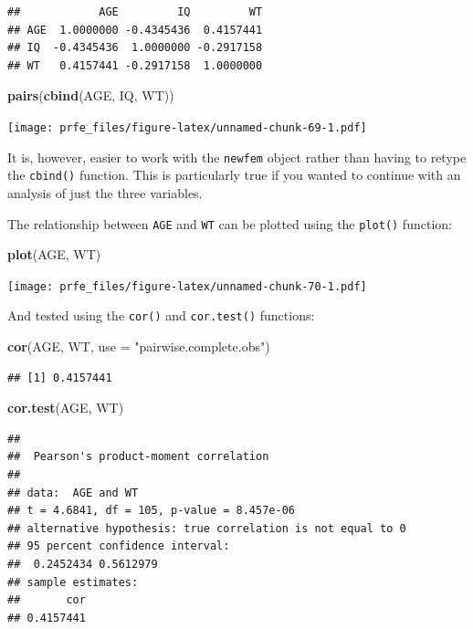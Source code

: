 \documentclass[12pt,]{book}
\newenvironment{Shaded}{\begin{snugshade}}{\end{snugshade}}
\newcommand{\KeywordTok}[1]{\textcolor[rgb]{0.13,0.29,0.53}{\textbf{#1}}}
\newcommand{\DataTypeTok}[1]{\textcolor[rgb]{0.13,0.29,0.53}{#1}}
\newcommand{\StringTok}[1]{\textcolor[rgb]{0.31,0.60,0.02}{#1}}
\newcommand{\NormalTok}[1]{#1}
\theoremstyle{definition}
\theoremstyle{definition}
\theoremstyle{definition}
\theoremstyle{remark}
\begin{document}
\begin{verbatim}
##            AGE         IQ         WT
## AGE  1.0000000 -0.4345436  0.4157441
## IQ  -0.4345436  1.0000000 -0.2917158
## WT   0.4157441 -0.2917158  1.0000000
\end{verbatim}

\begin{Shaded}
\begin{Highlighting}[]
\KeywordTok{pairs}\NormalTok{(}\KeywordTok{cbind}\NormalTok{(AGE, IQ, WT))}
\end{Highlighting}
\end{Shaded}

\texttt{[image: prfe\_files/figure-latex/unnamed-chunk-69-1.pdf]}

It is, however, easier to work with the \texttt{newfem} object rather
than having to retype the \texttt{cbind()} function. This is
particularly true if you wanted to continue with an analysis of just the
three variables.

The relationship between \texttt{AGE} and \texttt{WT} can be plotted
using the \texttt{plot()} function:

\begin{Shaded}
\begin{Highlighting}[]
\KeywordTok{plot}\NormalTok{(AGE, WT)}
\end{Highlighting}
\end{Shaded}

\texttt{[image: prfe\_files/figure-latex/unnamed-chunk-70-1.pdf]}

And tested using the \texttt{cor()} and \texttt{cor.test()} functions:

\begin{Shaded}
\begin{Highlighting}[]
\KeywordTok{cor}\NormalTok{(AGE, WT, }\DataTypeTok{use =} \StringTok{"pairwise.complete.obs"}\NormalTok{)}
\end{Highlighting}
\end{Shaded}

\begin{verbatim}
## [1] 0.4157441
\end{verbatim}

\begin{Shaded}
\begin{Highlighting}[]
\KeywordTok{cor.test}\NormalTok{(AGE, WT)}
\end{Highlighting}
\end{Shaded}

\begin{verbatim}
## 
##  Pearson's product-moment correlation
## 
## data:  AGE and WT
## t = 4.6841, df = 105, p-value = 8.457e-06
## alternative hypothesis: true correlation is not equal to 0
## 95 percent confidence interval:
##  0.2452434 0.5612979
## sample estimates:
##       cor 
## 0.4157441
\end{verbatim}
\end{document}
